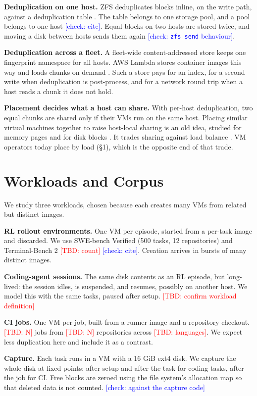 \documentclass[10pt,twocolumn]{article}
\newcommand{\TBD}[1]{\textcolor{red}{[TBD: #1]}}
\newcommand{\chk}[1]{\textcolor{blue}{[check: #1]}}
\begin{document}
\textbf{Deduplication on one host.} ZFS deduplicates blocks inline, on the write path, against a deduplication table \cite{openzfs-concepts}. The table belongs to one storage pool, and a pool belongs to one host \chk{cite}. Equal blocks on two hosts are stored twice, and moving a disk between hosts sends them again \chk{\texttt{zfs send} behaviour}.

\textbf{Deduplication across a fleet.} A fleet-wide content-addressed store keeps one fingerprint namespace for all hosts. AWS Lambda stores container images this way and loads chunks on demand \cite{lambda}. Such a store pays for an index, for a second write when deduplication is post-process, and for a network round trip when a host reads a chunk it does not hold.

\textbf{Placement decides what a host can share.} With per-host deduplication, two equal chunks are shared only if their VMs run on the same host. Placing similar virtual machines together to raise host-local sharing is an old idea, studied for memory pages \cite{memory-buddies,sindelar} and for disk blocks \cite{smio}. It trades sharing against load balance \cite{dong}. VM operators today place by load (\S1), which is the opposite end of that trade.

\section{Workloads and Corpus}

We study three workloads, chosen because each creates many VMs from related but distinct images.

\textbf{RL rollout environments.} One VM per episode, started from a per-task image and discarded. We use SWE-bench Verified (500 tasks, 12 repositories) \cite{swebench-verified} and Terminal-Bench 2 \TBD{count} \chk{cite}. Creation arrives in bursts of many distinct images.

\textbf{Coding-agent sessions.} The same disk contents as an RL episode, but long-lived: the session idles, is suspended, and resumes, possibly on another host. We model this with the same tasks, paused after setup. \TBD{confirm workload definition}

\textbf{CI jobs.} One VM per job, built from a runner image and a repository checkout. \TBD{N} jobs from \TBD{N} repositories across \TBD{languages}. We expect less duplication here and include it as a contrast.

\textbf{Capture.} Each task runs in a VM with a 16 GiB ext4 disk. We capture the whole disk at fixed points: after setup and after the task for coding tasks, after the job for CI. Free blocks are zeroed using the file system's allocation map so that deleted data is not counted. \chk{against the capture code}
\end{document}
